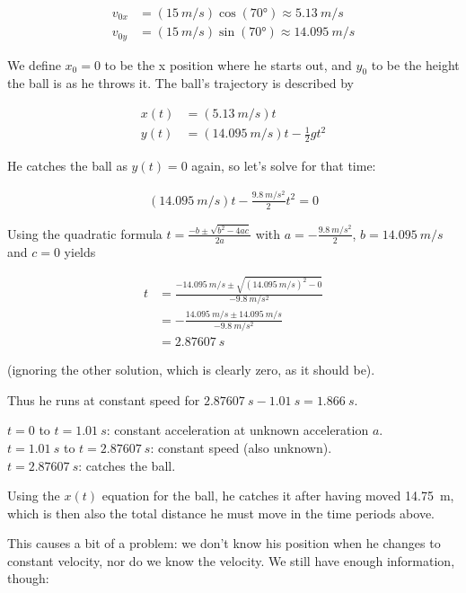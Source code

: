\documentclass[8.01x]{subfiles}
\begin{document}
\begin{align}
v_{0x} &= (\SI{15}{m/s}) \cos(\ang{70}) \approx \SI{5.13}{m/s}\\
v_{0y} &= (\SI{15}{m/s}) \sin(\ang{70}) \approx \SI{14.095}{m/s}
\end{align}

We define $x_0 = 0$ to be the x position where he starts out, and $y_0$ to be the height the ball is as he throws it. The ball's trajectory is described by

\begin{align}
x(t) &= (\SI{5.13}{m/s}) t\\
y(t) &= (\SI{14.095}{m/s}) t - \frac{1}{2} g t^2
\end{align}

He catches the ball as $y(t) = 0$ again, so let's solve for that time:

\begin{align}
(\SI{14.095}{m/s}) t - \frac{\SI{9.8}{m/s^2}}{2} t^2 = 0
\end{align}

Using the quadratic formula $t = \frac{-b \pm \sqrt{b^2 - 4ac}}{2a}$ with $a = - \frac{\SI{9.8}{m/s^2}}{2}$, $b = \SI{14.095}{m/s}$ and $c = 0$ yields

\begin{align}
t &= \frac{-\SI{14.095}{m/s} \pm \sqrt{(\SI{14.095}{m/s})^2 - 0}}{-\SI{9.8}{m/s^2}}\\
  &= -\frac{\SI{14.095}{m/s} \pm \SI{14.095}{m/s}}{\SI{-9.8}{m/s^2}}\\
  &= \SI{2.87607}{s}
\end{align}

(ignoring the other solution, which is clearly zero, as it should be).

Thus he runs at constant speed for $\SI{2.87607}{s} - \SI{1.01}{s} = \SI{1.866}{s}$.

$t = 0$ to $t = \SI{1.01}{s}$: constant acceleration at unknown acceleration $a$.\\
$t = \SI{1.01}{s}$ to $t = \SI{2.87607}{s}$: constant speed (also unknown).\\
$t = \SI{2.87607}{s}$: catches the ball.

Using the $x(t)$ equation for the ball, he catches it after having moved \SI{14.75}{m}, which is then also the total distance he must move in the time periods above.

This causes a bit of a problem: we don't know his position when he changes to constant velocity, nor do we know the velocity. We still have enough information, though:
\end{document}
